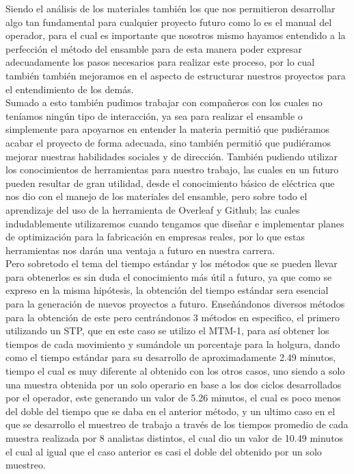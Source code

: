 Siendo el análisis de los materiales también los que nos permitieron desarrollar algo tan fundamental para cualquier proyecto futuro como lo es el manual del operador, para el cual es importante que nosotros mismo hayamos entendido a la perfección el método del ensamble para de esta manera poder expresar adecuadamente los pasos necesarios para realizar este proceso, por lo cual también también mejoramos en el aspecto de estructurar nuestros proyectos para el entendimiento de los demás.
\\Sumado a esto también pudimos trabajar con compañeros con los cuales no teníamos ningún tipo de interacción, ya sea  para realizar el ensamble o simplemente para apoyarnos en entender la materia permitió que pudiéramos acabar el proyecto de forma adecuada, sino también permitió que pudiéramos mejorar nuestras habilidades sociales y de dirección. También pudiendo utilizar los conocimientos de herramientas  para nuestro trabajo, las cuales en un futuro pueden resultar de gran utilidad, desde el conocimiento básico de eléctrica que nos dio con el manejo de los materiales del ensamble, pero sobre todo el aprendizaje del uso de la herramienta de Overleaf y Github; las cuales indudablemente utilizaremos cuando tengamos que diseñar e implementar planes de optimización para la fabricación en empresas reales, por lo que estas herramientas nos darán una ventaja a futuro en nuestra carrera. 
\\Pero sobretodo el tema del tiempo estándar y los métodos que se pueden llevar para obtenerlos es sin duda el conocimiento más útil a futuro, ya que como se expreso en la misma hipótesis, la obtención del tiempo estándar sera esencial para la generación de nuevos proyectos a futuro. Enseñándonos diversos métodos para la obtención de este pero centrándonos 3 métodos en especifico, el primero utilizando un STP, que en este caso se utilizo el MTM-1, para así obtener los tiempos de cada movimiento y sumándole un porcentaje para la holgura, dando como el tiempo estándar para su desarrollo de aproximadamente 2.49 minutos, tiempo el cual es muy diferente al obtenido con los otros casos, uno siendo a solo una muestra obtenida por un solo operario en base a los dos ciclos desarrollados por el operador, este generando un valor de 5.26 minutos, el cual es poco menos del doble del tiempo que se daba en el anterior método, y un ultimo caso en el que se desarrollo el muestreo de trabajo a través de los tiempos promedio de cada muestra realizada por 8 analistas distintos, el cual dio un valor de 10.49 minutos el cual al igual que el caso anterior es casi el doble del obtenido por un solo muestreo.
